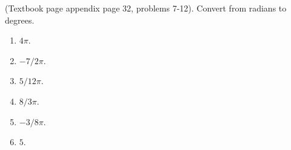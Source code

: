 (Textbook page appendix page 32, problems 7-12). 
Convert from radians to degrees.
\begin{multicols}{3}
\begin{enumerate}
\item $4\pi$.
\item $-7/2\pi$.
\item $5/12\pi$.
\item $8/3\pi$.
\item $-3/8\pi$.
\item $5$.
\end{enumerate}
\end{multicols}